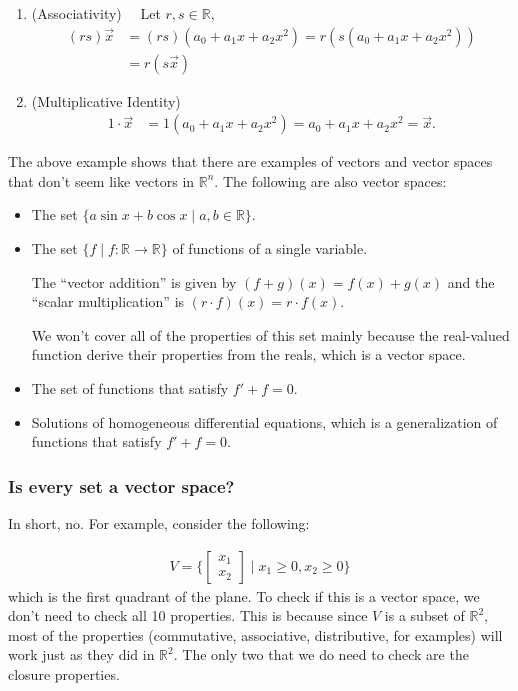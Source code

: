 \begin{example}
\begin{enumerate}
\item (Associativity)~~ Let $r, s \in \mathbb{R}$, 
\begin{align*}
(rs) \vec{x} & = (rs) (a_0 + a_1 x + a_2 x^2) = r (s(a_0 + a_1 x + a_2 x^2)) \\
& = r (s \vec{x}) 
\end{align*}

\item (Multiplicative Identity)
\begin{align*}
1 \cdot \vec{x} & = 1 (a_0 + a_1 x + a_2 x^2) = a_0 + a_1 x + a_2 x^2 = \vec{x}.  
\end{align*}
\end{enumerate}
  \end{example} 

The above example shows that there are examples of vectors and vector spaces that don't seem like vectors in $\mathbb{R}^n$.  The following are also vector spaces:
\begin{itemize}
  \item The set $\{a \sin x + b \cos x \; | \; a, b \in \mathbb{R} \}$. 
  \item The set $\{ f \; | \; f: \mathbb{R} \rightarrow \mathbb{R} \}$ of functions of a single variable.  

The ``vector addition'' is given by $(f+g) (x)= f(x) + g(x)$ and the ``scalar multiplication'' is $(r \cdot f) (x) = r \cdot f(x)$.  

We won't cover all of the properties of this set mainly because the real-valued function derive their properties from the reals, which is a vector space.  


\item The set of functions that satisfy $f'+f=0$.  
  \item Solutions of homogeneous differential equations, which is a generalization of functions that satisfy $f'+f=0$.    
\end{itemize}

\subsubsection{Is every set a vector space?}

In short, no.  For example, consider the following:

%
\begin{align*}
V = \{ \begin{bmatrix}
x_1 \\ x_2 
\end{bmatrix} \; | \; x_1 \geq 0, x_2 \geq 0 \} 
\end{align*}
which is the first quadrant of the plane.     To check if this is a vector space, we don't need to check all 10 properties.  This is because since $V$ is a subset of $\mathbb{R}^2$, most of the properties (commutative, associative, distributive, for examples) will work just as they did in $\mathbb{R}^2$.  The only two that we do need to check are the closure properties.  

